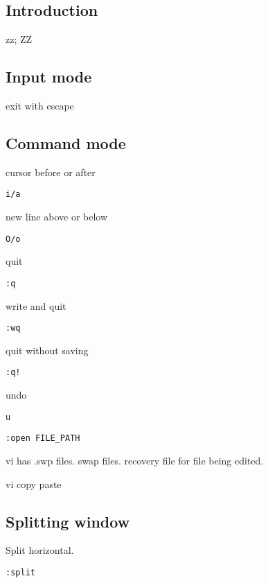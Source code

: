 
\subsection{Introduction}



zz; ZZ



\subsection{Input mode}
exit with escape

\subsection{Command mode}

cursor before or after

\begin{verbatim}
i/a
\end{verbatim}

new line above or below

\begin{verbatim}
O/o
\end{verbatim}

quit
\begin{verbatim}
:q
\end{verbatim}

write and quit
\begin{verbatim}
:wq
\end{verbatim}

quit without saving
\begin{verbatim}
:q!
\end{verbatim}

undo
\begin{verbatim}
u
\end{verbatim}


\begin{verbatim}
:open FILE_PATH
\end{verbatim}


vi has .swp files. swap files. recovery file for file being edited.

vi copy paste


\subsection{Splitting window}

Split horizontal.
\begin{verbatim}
:split
\end{verbatim}

